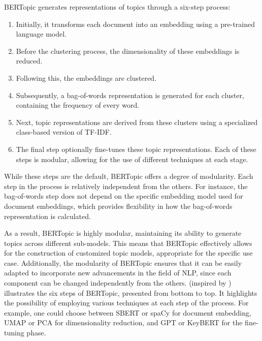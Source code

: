 BERTopic generates representations of topics through a six-step process:

\begin{enumerate}
    \item Initially, it transforms each document into an embedding using a pre-trained language model.
    \item Before the clustering process, the dimensionality of these embeddings is reduced.
    \item Following this, the embeddings are clustered.
    \item Subsequently, a bag-of-words representation is generated for each cluster, containing the frequency of every word.
    \item Next, topic representations are derived from these clusters using a specialized class-based version of TF-IDF.
    \item The final step optionally fine-tunes these topic representations. Each of these steps is modular, allowing for the use of different techniques at each stage.
\end{enumerate}

While these steps are the default, BERTopic offers a degree of modularity. Each step in the process is relatively independent from the others. For instance, the bag-of-words step does not depend on the specific embedding model used for document embeddings, which provides flexibility in how the bag-of-words representation is calculated.

As a result, BERTopic is highly modular, maintaining its ability to generate topics across different sub-models. This means that BERTopic effectively allows for the construction of customized topic models, appropriate for the specific use case. Additionally, the modularity of BERTopic ensures that it can be easily adapted to incorporate new advancements in the field of NLP, since each component can be changed independently from the others.  (inspired by \cite{grootendorst_algorithm_nodate}) illustrates the six steps of BERTopic, presented from bottom to top. It highlights the possibility of employing various techniques at each step of the process. For example, one could choose between SBERT or spaCy for document embedding, UMAP \cite{mcinnes_umap_2020} or PCA \cite{abdi_principal_2010} for dimensionality reduction, and GPT or KeyBERT \cite{grootendorst_maartengrkeybert_2024} for the fine-tuning phase.

